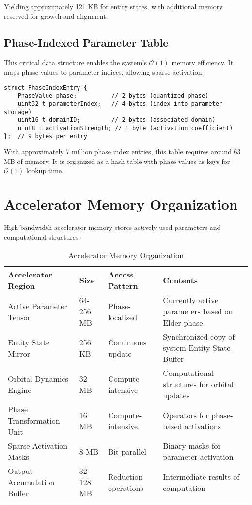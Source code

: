 Yielding approximately 121 KB for entity states, with additional memory reserved for growth and alignment.

\subsection{Phase-Indexed Parameter Table}

This critical data structure enables the system's $\mathcal{O}(1)$ memory efficiency. It maps phase values to parameter indices, allowing sparse activation:

\begin{tcolorbox}[colback=LightGray, colframe=DarkGray, title=Phase-Indexed Parameter Table Structure, fonttitle=\bfseries]
\begin{verbatim}
struct PhaseIndexEntry {
    PhaseValue phase;          // 2 bytes (quantized phase)  
    uint32_t parameterIndex;   // 4 bytes (index into parameter storage)
    uint16_t domainID;         // 2 bytes (associated domain)
    uint8_t activationStrength; // 1 byte (activation coefficient)
};  // 9 bytes per entry
\end{verbatim}
\end{tcolorbox}

With approximately 7 million phase index entries, this table requires around 63 MB of memory. It is organized as a hash table with phase values as keys for $\mathcal{O}(1)$ lookup time.

\section{Accelerator Memory Organization}

High-bandwidth accelerator memory stores actively used parameters and computational structures:

\begin{table}[h]
\centering
\small
\begin{tabular}{|p{3.5cm}|p{2.5cm}|p{3.2cm}|p{4.3cm}|}
\hline
\textbf{Accelerator Region} & \textbf{Size} & \textbf{Access Pattern} & \textbf{Contents} \\
\hline
Active Parameter Tensor & 64-256 MB & Phase-localized & Currently active parameters based on Elder phase \\
\hline
Entity State Mirror & 256 KB & Continuous update & Synchronized copy of system Entity State Buffer \\
\hline
Orbital Dynamics Engine & 32 MB & Compute-intensive & Computational structures for orbital updates \\
\hline
Phase Transformation Unit & 16 MB & Compute-intensive & Operators for phase-based activations \\
\hline
Sparse Activation Masks & 8 MB & Bit-parallel & Binary masks for parameter activation \\
\hline
Output Accumulation Buffer & 32-128 MB & Reduction operations & Intermediate results of computation \\
\hline
\end{tabular}
\caption{Accelerator Memory Organization}
\end{table}


